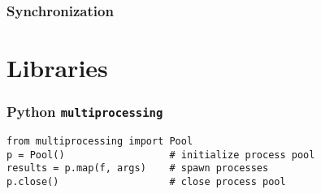\documentclass{beamer}
\begin{document}
\begin{frame}
\frametitle{Synchronization}
\end{frame}



\section{Libraries}
\begin{frame}[fragile]
\frametitle{Python \texttt{multiprocessing}}
\begin{verbatim}
from multiprocessing import Pool
p = Pool()                  # initialize process pool
results = p.map(f, args)    # spawn processes
p.close()                   # close process pool 
\end{verbatim}
\end{frame}

\frame{\tableofcontents}

\frame{\titlepage}
\end{document}
